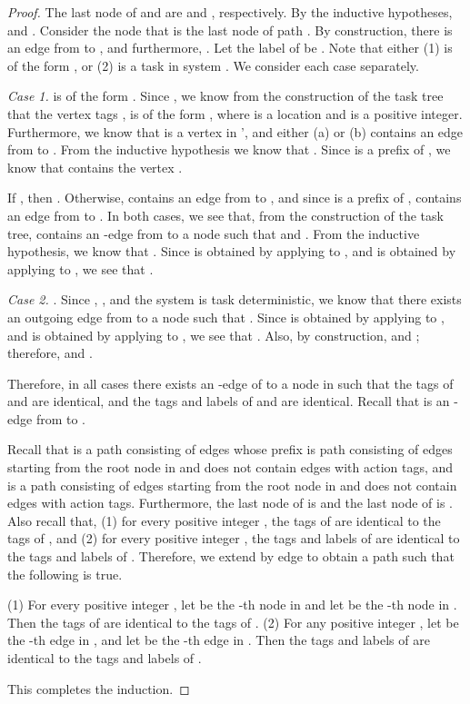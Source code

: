 \documentclass[11pt]{article}
\numberwithin{theorem}{section}
\begin{document}
\begin{proof}
The last node of  and  are  and , respectively. By the inductive hypotheses,  and . Consider the node  that is the last node of path . By construction, there is an edge  from  to , and furthermore, . Let the label of  be . Note that either (1)  is of the form , or (2)  is a task in system . We consider each case separately.

\emph{Case 1.}  is of the form . Since , we know from the construction of the task tree that the vertex tags ,  is of the form , where  is a location and  is a positive integer. Furthermore, we know that  is a vertex in ', and either (a)  or (b)  contains an edge from  to . 
From the inductive hypothesis we know that . Since  is a prefix of , we know that  contains the vertex . 

If , then . Otherwise,  contains an edge from  to , and since  is a prefix of ,  contains an edge from  to .
In both cases, we see that, from the construction of the task tree,  contains an -edge  from  to a node  such that  and . From the inductive hypothesis, we know that .  Since  is obtained by applying  to , and  is obtained by applying  to , we see that .

\emph{Case 2.} . Since , , and the system is task deterministic, we know that there exists an outgoing  edge  from  to a node  such that . Since  is obtained by applying  to , and  is obtained by applying  to , we see that . Also, by construction,  and ; therefore,  and .

Therefore, in all cases there exists an -edge  of  to a node  in  such that  the tags  of  and  are identical, and the tags and labels of  and  are identical. Recall that  is an -edge from  to .


Recall that  is a path consisting of  edges whose prefix is path  consisting of  edges starting from the root node in   and does not contain edges with  action tags, and  is a path consisting of  edges starting from the root node in   and does not contain edges with  action tags. Furthermore, the last node of  is  and the last node of  is . Also recall that, (1) for every positive integer , the tags of  are identical to the tags of , and (2) for every positive integer , the tags and labels of  are identical to the tags and labels of . Therefore, we extend  by edge  to obtain a path  such that the following is true.

(1) For every positive integer , let  be the -th node in  and let  be the -th node in . Then the tags of  are identical to the tags of . (2) For any positive integer , let  be the -th edge in , and let  be the -th edge in . Then the tags and labels of  are identical to the tags and labels of .

This completes the induction.
\end{proof}
\end{document}
